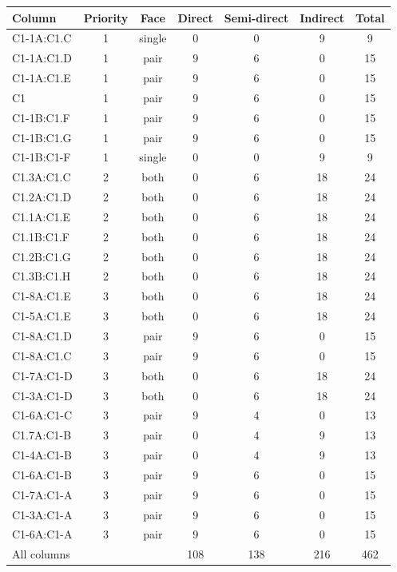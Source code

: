 \begin{tabular}{lcccccc}
\toprule
Column & Priority & Face & Direct & Semi-direct & Indirect & Total \\
\midrule
C1-1A:C1.C & 1 & single & 0 & 0 & 9 & 9 \\
C1-1A:C1.D & 1 & pair & 9 & 6 & 0 & 15 \\
C1-1A:C1.E & 1 & pair & 9 & 6 & 0 & 15 \\
C1 & 1 & pair & 9 & 6 & 0 & 15 \\
C1-1B:C1.F & 1 & pair & 9 & 6 & 0 & 15 \\
C1-1B:C1.G & 1 & pair & 9 & 6 & 0 & 15 \\
C1-1B:C1-F & 1 & single & 0 & 0 & 9 & 9 \\
C1.3A:C1.C & 2 & both & 0 & 6 & 18 & 24 \\
C1.2A:C1.D & 2 & both & 0 & 6 & 18 & 24 \\
C1.1A:C1.E & 2 & both & 0 & 6 & 18 & 24 \\
C1.1B:C1.F & 2 & both & 0 & 6 & 18 & 24 \\
C1.2B:C1.G & 2 & both & 0 & 6 & 18 & 24 \\
C1.3B:C1.H & 2 & both & 0 & 6 & 18 & 24 \\
C1-8A:C1.E & 3 & both & 0 & 6 & 18 & 24 \\
C1-5A:C1.E & 3 & both & 0 & 6 & 18 & 24 \\
C1-8A:C1.D & 3 & pair & 9 & 6 & 0 & 15 \\
C1-8A:C1.C & 3 & pair & 9 & 6 & 0 & 15 \\
C1-7A:C1-D & 3 & both & 0 & 6 & 18 & 24 \\
C1-3A:C1-D & 3 & both & 0 & 6 & 18 & 24 \\
C1-6A:C1-C & 3 & pair & 9 & 4 & 0 & 13 \\
C1.7A:C1-B & 3 & pair & 0 & 4 & 9 & 13 \\
C1-4A:C1-B & 3 & pair & 0 & 4 & 9 & 13 \\
C1-6A:C1-B & 3 & pair & 9 & 6 & 0 & 15 \\
C1-7A:C1-A & 3 & pair & 9 & 6 & 0 & 15 \\
C1-3A:C1-A & 3 & pair & 9 & 6 & 0 & 15 \\
C1-6A:C1-A & 3 & pair & 9 & 6 & 0 & 15 \\
\midrule
All columns & & & 108 & 138 & 216 & 462 \\
\bottomrule
\end{tabular}
